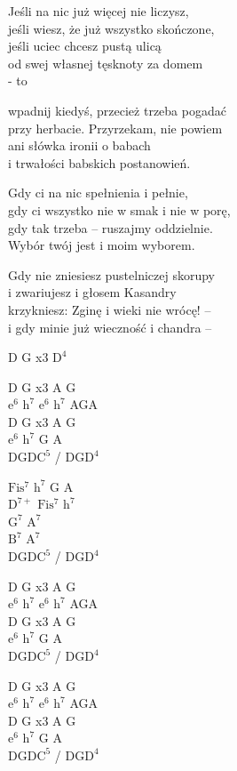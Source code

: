\begin{text}
    \hfill\break
    \hfill\break
    Jeśli na nic już więcej nie liczysz,\\
    jeśli wiesz, że już wszystko skończone,\\
    jeśli uciec chcesz pustą ulicą\\
    od swej własnej tęsknoty za domem\\
    - to

    \vin wpadnij kiedyś, przecież trzeba pogadać\\
    \vin przy herbacie. Przyrzekam, nie powiem\\
    \vin ani słówka ironii o babach\\
    \vin i trwałości babskich postanowień.

    \hfill\break
    Gdy ci na nic spełnienia i pełnie,\\
    gdy ci wszystko nie w smak i nie w porę,\\
    gdy tak trzeba – ruszajmy oddzielnie.\\
    Wybór twój jest i moim wyborem.

    \hfill\break
    Gdy nie zniesiesz pustelniczej skorupy\\
    i zwariujesz i głosem Kasandry\\
    krzykniesz: Zginę i wieki nie wrócę! –\\
    i gdy minie już wieczność i chandra –
\end{text}
\begin{chord}
    D G x3 $\mathrm{D^4}$

    D G x3 A G\\
    $\mathrm{e^6}$ $\mathrm{h^7}$ $\mathrm{e^6}$ $\mathrm{h^7}$ AGA\\
    D G x3 A G\\
    $\mathrm{e^6}$ $\mathrm{h^7}$ G A\\
    DGD$\mathrm{C^5}$ / DG$\mathrm{D^4}$

    $\mathrm{Fis^7}$ $\mathrm{h^7}$ G A\\
    $\mathrm{D^{7+}}$ $\mathrm{Fis^7}$ $\mathrm{h^7}$\\
    $\mathrm{G^7}$ $\mathrm{A^7}$\\
    $\mathrm{B^7}$ $\mathrm{A^7}$\\
    DGD$\mathrm{C^5}$ / DG$\mathrm{D^4}$

    D G x3 A G\\
    $\mathrm{e^6}$ $\mathrm{h^7}$ $\mathrm{e^6}$ $\mathrm{h^7}$ AGA\\
    D G x3 A G\\
    $\mathrm{e^6}$ $\mathrm{h^7}$ G A\\
    DGD$\mathrm{C^5}$ / DG$\mathrm{D^4}$

    D G x3 A G\\
    $\mathrm{e^6}$ $\mathrm{h^7}$ $\mathrm{e^6}$ $\mathrm{h^7}$ AGA\\
    D G x3 A G\\
    $\mathrm{e^6}$ $\mathrm{h^7}$ G A\\
    DGD$\mathrm{C^5}$ / DG$\mathrm{D^4}$
\end{chord}
